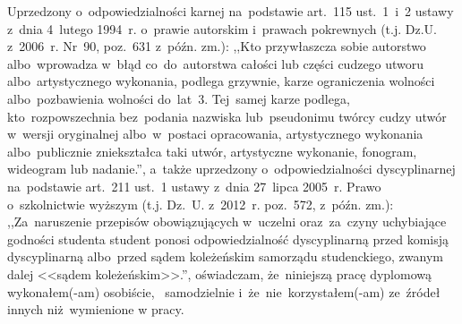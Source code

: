 
\begin{declaration}

{Uprzedzony o~odpowiedzialno\'sci karnej na~podstawie art.~115 ust.~1~i~2 ustawy z~dnia 4~lutego 1994~r. o~prawie autorskim i~prawach pokrewnych
(t.j. Dz.U. z~2006~r. Nr~90, poz.~631 z~p{\'o}{\'z}n. zm.): ,,Kto przyw\l{}aszcza
sobie autorstwo albo~wprowadza w~b\l{}\k{a}d co~do~autorstwa ca\l{}o\'sci lub cz\k{e}\'sci cudzego utworu albo~artystycznego wykonania,
podlega grzywnie, karze ograniczenia wolno\'sci albo~pozbawienia wolno\'sci do~lat~3.
Tej~samej karze podlega, kto~rozpowszechnia bez~podania nazwiska lub~pseudonimu tw\'orcy cudzy utw\'or w~wersji oryginalnej albo~w~postaci opracowania,
artystycznego wykonania albo~publicznie zniekszta\l{}ca taki utw\'or, artystyczne wykonanie, fonogram,
wideogram lub nadanie.'', a~tak\.ze uprzedzony o~odpowiedzialno\'sci dyscyplinarnej na~podstawie art.~211 ust.~1 ustawy z~dnia 27~lipca 2005~r.
Prawo o~szkolnictwie wy\.zszym (t.j. Dz.~U. z~2012~r. poz.~572, z~p\'o\'zn. zm.): ,,Za~naruszenie przepis\'ow obowi\k{a}zuj\k{a}cych
w~uczelni oraz~za~czyny uchybiaj\k{a}ce godno\'sci studenta student ponosi odpowiedzialno\'s\'c dyscyplinarn\k{a} przed komisj\k{a} dyscyplinarn\k{a}
albo~przed s\k{a}dem kole\.ze\'nskim samorz\k{a}du studenckiego,
zwanym dalej <<s\k{a}dem kole\.ze\'nskim>>.'', o\'swiadczam, \.ze~niniejsz\k{a} prac\k{e} dyplomow\k{a} wykona\l{}em(-am) osobi\'scie,
~samodzielnie i~\.ze~nie~korzysta\l{}em(-am) ze~\'zr\'ode\l{} innych ni\.z~wymienione w pracy.}

\end{declaration}

